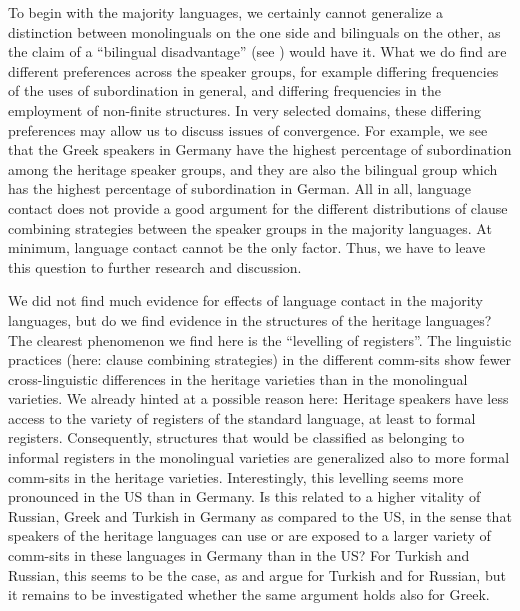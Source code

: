 \documentclass[output=paper,colorlinks,citecolor=brown]{langscibook}
\begin{document}
To begin with the majority languages, we certainly cannot generalize a distinction between monolinguals on the one side and bilinguals on the other, as the claim of a “bilingual disadvantage” (see ) would have it. What we do find are different preferences across the speaker groups, for example differing frequencies of the uses of subordination in general, and differing frequencies in the employment of non-finite structures. In very selected domains, these differing preferences may allow us to discuss issues of convergence. For example, we see that the Greek speakers in Germany have the highest percentage of subordination among the heritage speaker groups, and they are also the bilingual group which has the highest percentage of subordination in German. All in all, language contact does not provide a good argument for the different distributions of clause combining strategies between the speaker groups in the majority languages. At minimum, language contact cannot be the only factor. Thus, we have to leave this question to further research and discussion.

We did not find much evidence for effects of language contact in the majority languages, but do we find evidence in the structures of the heritage languages? The clearest phenomenon we find here is the “levelling of registers”. The linguistic practices (here: clause combining strategies) in the different comm-sits show fewer cross-linguistic differences in the heritage varieties than in the monolingual varieties. We already hinted at a possible reason here: Heritage speakers have less access to the variety of registers of the standard language, at least to formal registers. Consequently, structures that would be classified as belonging to informal registers in the monolingual varieties are generalized also to more formal comm-sits in the heritage varieties. Interestingly, this levelling seems more pronounced in the US than in Germany. Is this related to a higher vitality of Russian, Greek and Turkish in Germany as compared to the US, in the sense that speakers of the heritage languages can use or are exposed to a larger variety of comm-sits in these languages in Germany than in the US? For Turkish and Russian, this seems to be the case, as \textcite{iefremenko2021converbs} and \textcite{schroeder2022} argue for Turkish and \textcite{martynova2024use} for Russian, but it remains to be investigated whether the same argument holds also for Greek.
\end{document}
